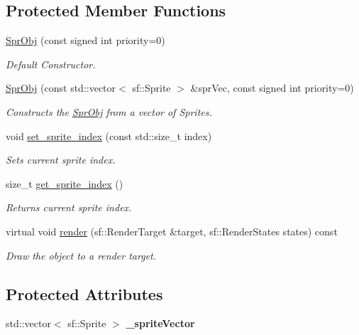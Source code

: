 \subsection*{Protected Member Functions}
\begin{DoxyCompactItemize}
\item 
\hyperlink{classhelios_1_1_spr_obj_a86df39cbe1cb1a0812f65d0b882431fc}{Spr\+Obj} (const signed int priority=0)
\begin{DoxyCompactList}\small\item\em Default Constructor. \end{DoxyCompactList}\item 
\hyperlink{classhelios_1_1_spr_obj_ac7671e148e2aabb8150b854a945e33e1}{Spr\+Obj} (const std\+::vector$<$ sf\+::\+Sprite $>$ \&spr\+Vec, const signed int priority=0)
\begin{DoxyCompactList}\small\item\em Constructs the \hyperlink{classhelios_1_1_spr_obj}{Spr\+Obj} from a vector of Sprites. \end{DoxyCompactList}\item 
void \hyperlink{classhelios_1_1_spr_obj_a3747018c4a587444b00e41b8c7bc8214}{set\+\_\+sprite\+\_\+index} (const std\+::size\+\_\+t index)
\begin{DoxyCompactList}\small\item\em Sets current sprite index. \end{DoxyCompactList}\item 
size\+\_\+t \hyperlink{classhelios_1_1_spr_obj_adc3623a8b932c03cf2e6131747926506}{get\+\_\+sprite\+\_\+index} ()
\begin{DoxyCompactList}\small\item\em Returns current sprite index. \end{DoxyCompactList}\item 
virtual void \hyperlink{classhelios_1_1_spr_obj_a779248e35120a473187b30495466986f}{render} (sf\+::\+Render\+Target \&target, sf\+::\+Render\+States states) const 
\begin{DoxyCompactList}\small\item\em Draw the object to a render target. \end{DoxyCompactList}\end{DoxyCompactItemize}
\subsection*{Protected Attributes}
\begin{DoxyCompactItemize}
\item 
\hypertarget{classhelios_1_1_spr_obj_a95f62c2c5caa7cc9f707ccf22c15a5b0}{}std\+::vector$<$ sf\+::\+Sprite $>$ {\bfseries \+\_\+sprite\+Vector}\label{classhelios_1_1_spr_obj_a95f62c2c5caa7cc9f707ccf22c15a5b0}

\end{DoxyCompactItemize}


